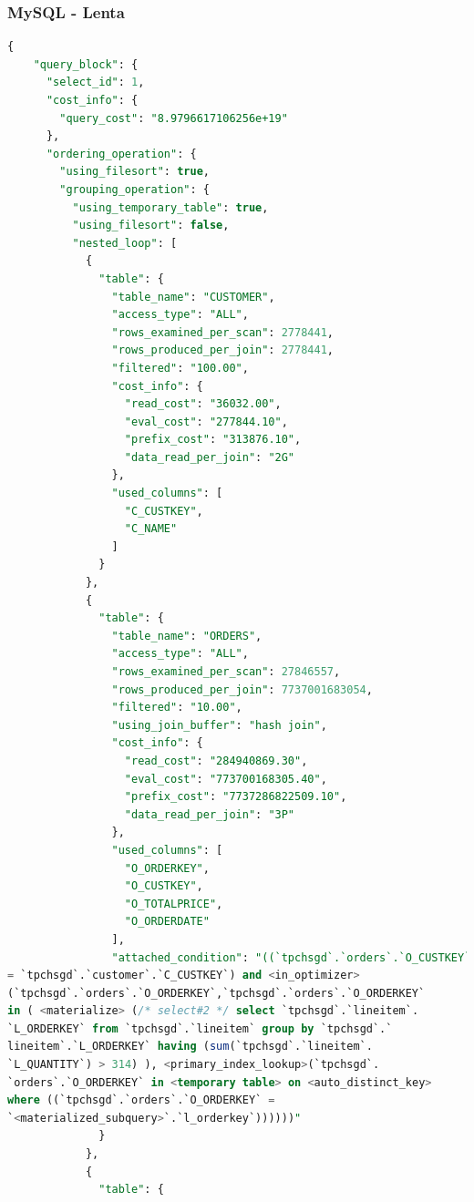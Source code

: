 \documentclass{article}
\begin{document}
\subsubsection{MySQL - Lenta}
\begin{lstlisting}[language=SQL]
  {
    "query_block": {
      "select_id": 1,
      "cost_info": {
        "query_cost": "8.9796617106256e+19"
      },
      "ordering_operation": {
        "using_filesort": true,
        "grouping_operation": {
          "using_temporary_table": true,
          "using_filesort": false,
          "nested_loop": [
            {
              "table": {
                "table_name": "CUSTOMER",
                "access_type": "ALL",
                "rows_examined_per_scan": 2778441,
                "rows_produced_per_join": 2778441,
                "filtered": "100.00",
                "cost_info": {
                  "read_cost": "36032.00",
                  "eval_cost": "277844.10",
                  "prefix_cost": "313876.10",
                  "data_read_per_join": "2G"
                },
                "used_columns": [
                  "C_CUSTKEY",
                  "C_NAME"
                ]
              }
            },
            {
              "table": {
                "table_name": "ORDERS",
                "access_type": "ALL",
                "rows_examined_per_scan": 27846557,
                "rows_produced_per_join": 7737001683054,
                "filtered": "10.00",
                "using_join_buffer": "hash join",
                "cost_info": {
                  "read_cost": "284940869.30",
                  "eval_cost": "773700168305.40",
                  "prefix_cost": "7737286822509.10",
                  "data_read_per_join": "3P"
                },
                "used_columns": [
                  "O_ORDERKEY",
                  "O_CUSTKEY",
                  "O_TOTALPRICE",
                  "O_ORDERDATE"
                ],
                "attached_condition": "((`tpchsgd`.`orders`.`O_CUSTKEY` 
= `tpchsgd`.`customer`.`C_CUSTKEY`) and <in_optimizer>
(`tpchsgd`.`orders`.`O_ORDERKEY`,`tpchsgd`.`orders`.`O_ORDERKEY` 
in ( <materialize> (/* select#2 */ select `tpchsgd`.`lineitem`.
`L_ORDERKEY` from `tpchsgd`.`lineitem` group by `tpchsgd`.`
lineitem`.`L_ORDERKEY` having (sum(`tpchsgd`.`lineitem`.
`L_QUANTITY`) > 314) ), <primary_index_lookup>(`tpchsgd`.
`orders`.`O_ORDERKEY` in <temporary table> on <auto_distinct_key>
where ((`tpchsgd`.`orders`.`O_ORDERKEY` = 
`<materialized_subquery>`.`l_orderkey`))))))"
              }
            },
            {
              "table": {

\end{lstlisting}
\end{document}
